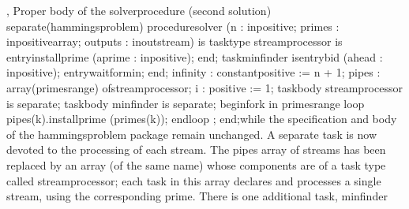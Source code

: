 ,
\FgBlock[]
\Parbox[]
Proper body of the %
\tyxffmxmono[]solver\tyxffmxendmono[] procedure (second solution)%
\FgEndcap[]
\Comp[]\tyxtstxbf[]separate\tyxtstxendbf[] (hammings\Symuns[]problem)
\tyxtstxbf[]procedure\tyxtstxendbf[] solver (n       : %
\tyxtstxbf[]in\tyxtstxendbf[]     positive;
                  primes  : \tyxtstxbf[]in\tyxtstxendbf[]     positive\Symuns[]array;
                  outputs : \tyxtstxbf[]in\tyxtstxendbf[] %
\tyxtstxbf[]out\tyxtstxendbf[] stream) \tyxtstxbf[]is%
\tyxtstxendbf[]
   \tyxtstxbf[]task\tyxtstxendbf[] \tyxtstxbf[]type%
\tyxtstxendbf[] stream\Symuns[]processor \tyxtstxbf[]is%
\tyxtstxendbf[]
      \tyxtstxbf[]entry\tyxtstxendbf[] install\Symuns[]prime (a\Symuns[]prime : %
\tyxtstxbf[]in\tyxtstxendbf[] positive);
   \tyxtstxbf[]end\tyxtstxendbf[];
   \tyxtstxbf[]task\tyxtstxendbf[] min\Symuns[]finder %
\tyxtstxbf[]is\tyxtstxendbf[]
      \tyxtstxbf[]entry\tyxtstxendbf[] bid (a\Symuns[]head : %
\tyxtstxbf[]in\tyxtstxendbf[] positive);
      \tyxtstxbf[]entry\tyxtstxendbf[] wait\Symuns[]for\Symuns[]min;
   \tyxtstxbf[]end\tyxtstxendbf[];
   infinity : \tyxtstxbf[]constant\tyxtstxendbf[] positive := n + 1;
   pipes    : \tyxtstxbf[]array\tyxtstxendbf[] (primes\rsquo[]range) %
\tyxtstxbf[]of\tyxtstxendbf[] stream\Symuns[]processor;
   i        : positive := 1;
   \tyxtstxbf[]task\tyxtstxendbf[] \tyxtstxbf[]body%
\tyxtstxendbf[] stream\Symuns[]processor \tyxtstxbf[]is%
\tyxtstxendbf[] \tyxtstxbf[]separate\tyxtstxendbf[];
   \tyxtstxbf[]task\tyxtstxendbf[] \tyxtstxbf[]body%
\tyxtstxendbf[] min\Symuns[]finder       \tyxtstxbf[]is%
\tyxtstxendbf[] \tyxtstxbf[]separate\tyxtstxendbf[];
\tyxtstxbf[]begin\tyxtstxendbf[]
   \tyxtstxbf[]for\tyxtstxendbf[] k \tyxtstxbf[]in%
\tyxtstxendbf[] primes\rsquo[]range \tyxtstxbf[]loop%
\tyxtstxendbf[]
      pipes(k).install\Symuns[]prime (primes(k));
   \tyxtstxbf[]end\tyxtstxendbf[] \tyxtstxbf[]loop%
\tyxtstxendbf[];
\tyxtstxbf[]end\tyxtstxendbf[];\Endcomp[]
\EndParbox[]
\FgEndblock[]
 while the specification and body of the \tyxffmxmono[]hammings\Symuns[]problem%
\tyxffmxendmono[] package remain unchanged. A separate task is now
devoted to the processing of each stream. The \tyxffmxmono[]pipes%
\tyxffmxendmono[] array of streams has been replaced by an array (of
the same name) whose components are of a task type called %
\tyxffmxmono[]stream\Symuns[]processor\tyxffmxendmono[]; each task
in this array declares and processes a single stream, using the corresponding
prime. There is one additional task, \tyxffmxmono[]min\Symuns[]finder%
